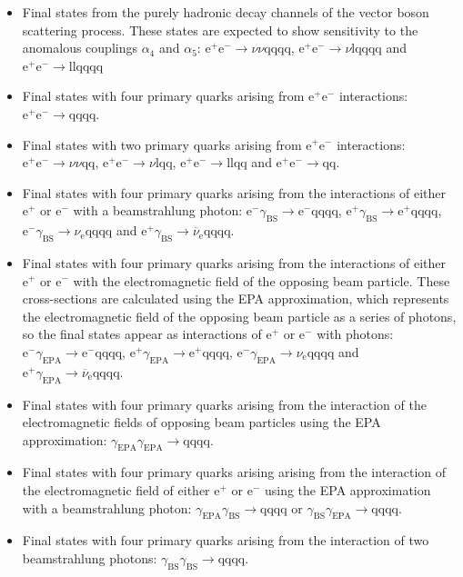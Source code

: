 \begin{itemize}
\item Final states from the purely hadronic decay channels of the vector boson scattering process.  These states are expected to show sensitivity to the anomalous couplings $\alpha_{4}$ and $\alpha_{5}$: $\text{e}^{+}\text{e}^{-} \rightarrow \nu\nu\text{qqqq}$, $\text{e}^{+}\text{e}^{-} \rightarrow \nu\text{lqqqq}$ and $\text{e}^{+}\text{e}^{-} \rightarrow \text{llqqqq}$
\item Final states with four primary quarks arising from $\text{e}^{+}\text{e}^{-}$ interactions: $\text{e}^{+}\text{e}^{-} \rightarrow \text{qqqq}$.
\item Final states with two primary quarks arising from $\text{e}^{+}\text{e}^{-}$ interactions: $\text{e}^{+}\text{e}^{-} \rightarrow \nu{\nu}\text{qq}$, $\text{e}^{+}\text{e}^{-} \rightarrow \nu\text{lqq}$, $\text{e}^{+}\text{e}^{-} \rightarrow \text{llqq}$ and $\text{e}^{+}\text{e}^{-} \rightarrow \text{qq}$.
\item Final states with four primary quarks arising from the interactions of either $\text{e}^{+}$ or $\text{e}^{-}$ with a beamstrahlung photon: $\text{e}^{-}\gamma_{\text{BS}} \rightarrow \text{e}^{-}\text{qqqq}$, $\text{e}^{+}\gamma_{\text{BS}} \rightarrow \text{e}^{+}\text{qqqq}$, $\text{e}^{-}\gamma_{\text{BS}} \rightarrow \nu_{\text{e}}\text{qqqq}$ and $\text{e}^{+}\gamma_{\text{BS}} \rightarrow \overline{\nu}_{\text{e}}\text{qqqq}$.
\item Final states with four primary quarks arising from the interactions of either $\text{e}^{+}$ or $\text{e}^{-}$ with the electromagnetic field of the opposing beam particle.  These cross-sections are calculated using the EPA approximation, which represents the electromagnetic field of the opposing beam particle as a series of photons, so the final states appear as interactions of $\text{e}^{+}$ or $\text{e}^{-}$ with photons: $\text{e}^{-}\gamma_{\text{EPA}} \rightarrow \text{e}^{-}\text{qqqq}$, $\text{e}^{+}\gamma_{\text{EPA}} \rightarrow \text{e}^{+}\text{qqqq}$, $\text{e}^{-}\gamma_{\text{EPA}} \rightarrow \nu_{\text{e}}\text{qqqq}$ and $\text{e}^{+}\gamma_{\text{EPA}} \rightarrow \overline{\nu}_{\text{e}}\text{qqqq}$.
\item Final states with four primary quarks arising from the interaction of the electromagnetic fields of opposing beam particles using the EPA approximation: $\gamma_{\text{EPA}}\gamma_{\text{EPA}} \rightarrow \text{qqqq}$.
\item Final states with four primary quarks arising arising from the interaction of the electromagnetic field of either $\text{e}^{+}$ or $\text{e}^{-}$ using the EPA approximation with a beamstrahlung photon: $\gamma_{\text{EPA}}\gamma_{\text{BS}} \rightarrow \text{qqqq}$ or $\gamma_{\text{BS}}\gamma_{\text{EPA}} \rightarrow \text{qqqq}$.
\item Final states with four primary quarks arising from the interaction of two beamstrahlung photons: $\gamma_{\text{BS}}\gamma_{\text{BS}} \rightarrow \text{qqqq}$.
\end{itemize}
